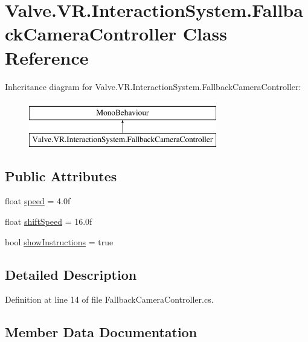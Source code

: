 \hypertarget{class_valve_1_1_v_r_1_1_interaction_system_1_1_fallback_camera_controller}{}\section{Valve.\+V\+R.\+Interaction\+System.\+Fallback\+Camera\+Controller Class Reference}
\label{class_valve_1_1_v_r_1_1_interaction_system_1_1_fallback_camera_controller}
Inheritance diagram for Valve.\+V\+R.\+Interaction\+System.\+Fallback\+Camera\+Controller\+:\begin{figure}[H]
\begin{center}
\leavevmode
\includegraphics[height=2.000000cm]{class_valve_1_1_v_r_1_1_interaction_system_1_1_fallback_camera_controller}
\end{center}
\end{figure}
\subsection*{Public Attributes}
\begin{DoxyCompactItemize}
\item 
float \mbox{\hyperlink{class_valve_1_1_v_r_1_1_interaction_system_1_1_fallback_camera_controller_a8b9e610801baae4ed6e64583a48c8152}{speed}} = 4.\+0f
\item 
float \mbox{\hyperlink{class_valve_1_1_v_r_1_1_interaction_system_1_1_fallback_camera_controller_a960938f46794cb6220640a8b26181ade}{shift\+Speed}} = 16.\+0f
\item 
bool \mbox{\hyperlink{class_valve_1_1_v_r_1_1_interaction_system_1_1_fallback_camera_controller_abb454e7996557d76358c38d1de1eeb49}{show\+Instructions}} = true
\end{DoxyCompactItemize}


\subsection{Detailed Description}


Definition at line 14 of file Fallback\+Camera\+Controller.\+cs.



\subsection{Member Data Documentation}
\mbox{\label{class_valve_1_1_v_r_1_1_interaction_system_1_1_fallback_camera_controller_a960938f46794cb6220640a8b26181ade}} 
